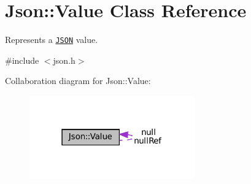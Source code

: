 \hypertarget{classJson_1_1Value}{}\section{Json\+:\+:Value Class Reference}
\label{classJson_1_1Value}


Represents a \href{http://www.json.org}{\tt J\+S\+ON} value.  




{\ttfamily \#include $<$json.\+h$>$}



Collaboration diagram for Json\+:\+:Value\+:
\nopagebreak
\begin{figure}[H]
\begin{center}
\leavevmode
\includegraphics[width=202pt]{classJson_1_1Value__coll__graph}
\end{center}
\end{figure}
